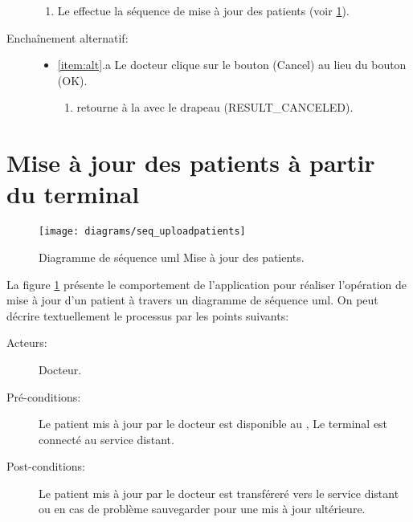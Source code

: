 \begin{description}
\begin{enumerate}
\item Le  effectue la séquence de mise à jour des patients (voir \ref{s:patientUpdate}).

\end{enumerate}

\item [Enchaînement alternatif:]

\begin{itemize}

\item \ref{item:alt}.a Le docteur clique sur le bouton (Cancel) au lieu du bouton (OK).
\begin{enumerate}

\item {} retourne à la  avec le drapeau (RESULT\_CANCELED).

\end{enumerate}

\end{itemize}


\end{description}

\section{Mise à jour des patients à partir du terminal}
\label{s:patientUpdate}

\begin{figure}
\center
\texttt{[image: diagrams/seq\_uploadpatients]}
\caption{Diagramme de séquence \gls{uml} Mise à jour des patients.}
\label{fig:seq_uploadpatients}
\end{figure}

La figure \ref{fig:seq_uploadpatients} présente le comportement de l'application pour réaliser l'opération de mise à jour d'un patient à travers un diagramme de séquence \gls{uml}. On peut décrire textuellement le processus par les points suivants:


\begin{description}

\item[Acteurs:] Docteur.

\item[Pré-conditions:] Le patient mis à jour par le docteur est disponible au , Le terminal est connecté au service distant.

\item[Post-conditions:] Le patient mis à jour par le docteur est transféreré vers le service distant ou en cas de problème sauvegarder pour une mis à jour ultérieure.

\end{description}

